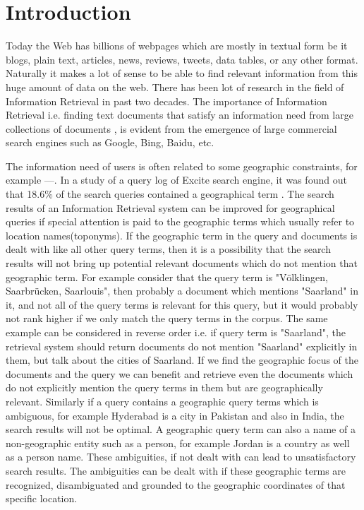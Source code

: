 \documentclass[
     11pt,         %
     a4paper,      %
     oneside,
     ]{article}
\begin{document}
\tableofcontents
\newpage





\section{Introduction}\label{sec:introduction}
Today the Web has billions of webpages which are mostly in textual form be it blogs, plain text, articles, news, reviews, tweets, data tables, or any other format. Naturally it makes a lot of sense to be able to find relevant information from this huge amount of data on the web. There has been lot of research in the field of Information Retrieval in past two decades. The importance of Information Retrieval i.e. finding text documents that satisfy an information need from large collections of documents \cite{Manning:2008:IIR:1394399}, is evident from the emergence of large commercial search engines such as Google, Bing, Baidu, etc.

The information need of users is often related to some geographic constraints, for example ---. In a study of a query log of Excite search engine, it was found out that 18.6\% of the search queries contained a geographical term \cite{Sanderson04analyzinggeographic}. The search results of an Information Retrieval system can be improved for geographical queries if special attention is paid to the geographic terms which usually refer to location names(toponyms). If the geographic term in the query and documents is dealt with like all other query terms, then it is a possibility that the search results will not bring up potential relevant documents which do not mention that geographic term. For example consider that the query term is "Völklingen, Saarbrücken, Saarlouis", then probably a document which mentions "Saarland" in it, and not all of the query terms is relevant for this query, but it would probably not rank higher if we only match the query terms in the corpus. The same example can be considered in reverse order i.e. if query term is "Saarland", the retrieval system should return documents do not mention "Saarland" explicitly in them, but talk about the cities of Saarland. If we find the geographic focus of the documents and the query we can benefit and retrieve even the documents which do not explicitly mention the query terms in them but are geographically relevant. Similarly if a query contains a geographic query terms which is ambiguous, for example Hyderabad is a city in Pakistan and also in India, the search results will not be optimal. A geographic query term can also a name of a non-geographic entity such as a person, for example Jordan is a country as well as a person name. These ambiguities, if not dealt with can lead to unsatisfactory search results. The ambiguities can be dealt with if these geographic terms are recognized, disambiguated and grounded to the geographic coordinates of that specific location. 
\end{document}
